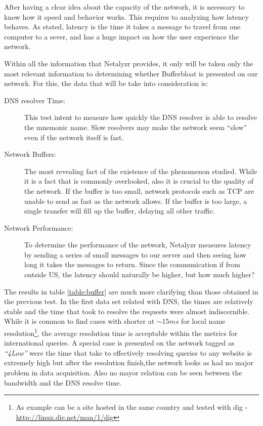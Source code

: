After having a clear idea about the capacity of the network, it is necessary
to know how it speed and behavior works. This requires to analyzing how
latency behaves. As stated, latency is the time it takes a message to travel
from one computer to a sever, and has a huge impact on how the user experience
the network.

Within all the information that Netalyzr provides, it only will be taken only
the most relevant information to determining whether Bufferbloat is presented
on our network. For this, the data that will be take into consideration is:

\begin{description}

\item [DNS resolver Time:] This test intent to measure how quickly the DNS
resolver is able to resolve the mnemonic name. Slow resolvers may make the
network seem ``slow'' even if the network itself is fast.

\item [Network Buffers:] The most revealing fact of the existence of the
phenomenon studied. While it is a fact that is commonly overlooked, also it is
crucial to the quality of the network. If the buffer is too small, network
protocols such as TCP are unable to send as fast as the network allows. If the
buffer is too large, a single transfer will fill up the buffer, delaying all
other traffic.

\item [Network Performance:] To determine the performance of the network,
Netalyzr measures latency by sending a series of small messages to our server
and then seeing how long it takes the messages to return. Since the
communication if from outside US, the latency should naturally be higher, but
how much higher?
\end{description}


The results in table \ref{table:buffer} are much more clarifying than those
obtained in the previous test. In the first data set related with DNS, the
times are relatively stable and the time that took to resolve the requests
were almost indiscernible. While it is common to find cases with shorter at
$\sim15ms$ for local name resolution\footnote{ As example can be a site hosted
in the same country and tested with dig -
\url{http://linux.die.net/man/1/dig}}, the average resolution time is
acceptable within the metrics for international queries. A special case is
presented on the network tagged as \textit{``4Low''} were the time that take
to effectively resolving queries to any website is extremely high but after
the resolution finish,the network looks as had no major problem in data
acquisition. Also no mayor relation can be seen between the bandwidth and the
DNS resolve time.

